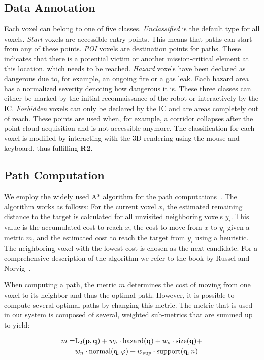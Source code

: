 \documentclass{egpubl}
\begin{document}
\subsection{Data Annotation} \label{sec:overview:annotation}
Each voxel can belong to one of five classes. \emph{Unclassified} is the default type for all voxels. \emph{Start} voxels are accessible entry points. This means that paths can start from any of these points. \emph{POI} voxels are destination points for paths. These indicates that there is a potential victim or another mission-critical element at this location, which needs to be reached. \emph{Hazard} voxels have been declared as dangerous due to, for example, an ongoing fire or a gas leak. Each hazard area has a normalized severity denoting how dangerous it is. These three classes can either be marked by the initial reconnaissance of the robot or interactively by the IC. \emph{Forbidden} voxels can only be declared by the IC and are areas completely out of reach. These points are used when, for example, a corridor collapses after the point cloud acquisition and is not accessible anymore. The classification for each voxel is modified by interacting with the 3D rendering using the mouse and keyboard, thus fulfilling {\bfseries R2}. 

\subsection{Path Computation} \label{sec:overview:pathcomputation}
We employ the widely used A* algorithm for the path computations~\cite{4082128}. The algorithm works as follows: For the current voxel $x$, the estimated remaining distance to the target is calculated for all unvisited neighboring voxels $y_i$. This value is the accumulated cost to reach $x$, the cost to move from $x$ to $y_i$ given a metric $m$, and the estimated cost to reach the target from $y_i$ using a heuristic. The neighboring voxel with the lowest cost is chosen as the next candidate. For a comprehensive description of the algorithm we refer to the book by Russel and Norvig~\cite{AStar}.

When computing a path, the metric $m$ determines the cost of moving from one voxel to its neighbor and thus the optimal path. However, it is possible to compute several optimal paths by changing this metric. The metric that is used in our system is composed of several, weighted sub-metrics that are summed up to yield:

\begin{equation}
\begin{array}{r@{}l}
m = & \textrm{L}_2(\mathbf{p},\mathbf{q}) + w_h \cdot \textrm{hazard}(\mathbf{q}) + w_s \cdot \textrm{size}(\mathbf{q}) + \vspace*{0.1cm} \\
  & w_n \cdot \textrm{normal}(\mathbf{q},\varphi) + w_{sup} \cdot \textrm{support}(\mathbf{q},n)
\end{array}
\label{eqn:metric}
\end{equation}
\end{document}
